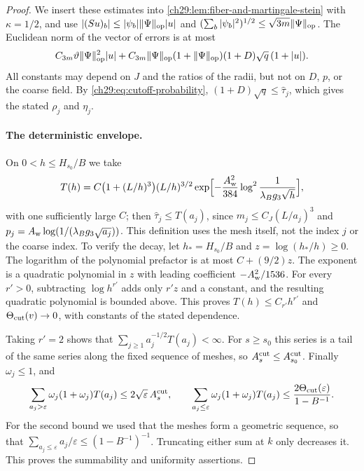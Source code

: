 \begin{proof}
We insert these estimates into \cref{ch29:lem:fiber-and-martingale-stein} with $\kappa=1/2$, and use $|(Su)_b|\le|\psi_b|\|\Psi\|_{\rm op}|u|$ and $(\sum_b|\psi_b|^2)^{1/2}\le\sqrt{3m}\|\Psi\|_{\rm op}$. The Euclidean norm of the vector of errors is at most
\[
 C_{3m}\vartheta\|\Psi\|_{\rm op}^2|u|+C_{3m}\|\Psi\|_{\rm op}(1+\|\Psi\|_{\rm op})(1+D)\sqrt q\,(1+|u|).
\]
All constants may depend on $J$ and the ratios of the radii, but not on $D$, $p$, or the coarse field. By \eqref{ch29:eq:cutoff-probability}, $(1+D)\sqrt q\le\widehat\tau_j$, which gives the stated $\rho_j$ and $\eta_j$.

\paragraph{The deterministic envelope.}
On $0<h\le H_{s_0}/B$ we take
\begin{equation}\label{ch29:eq:tail-envelope}
 T(h)=C\bigl(1+(L/h)^3\bigr)(L/h)^{3/2}\exp\Bigl[-\frac{A_{\rm w}^2}{384}\log^2\frac1{\lambda_Bg_3\sqrt h}\Bigr],
\end{equation}
with one sufficiently large $C$; then $\widehat\tau_j\le T(a_j)$, since $m_j\le C_J(L/a_j)^3$ and $p_j=A_{\rm w}\log(1/(\lambda_Bg_3\sqrt{a_j}))$. This definition uses the mesh itself, not the index $j$ or the coarse index. To verify the decay, let $h_*=H_{s_0}/B$ and $z=\log(h_*/h)\ge0$. The logarithm of the polynomial prefactor is at most $C+(9/2)z$. The exponent is a quadratic polynomial in $z$ with leading coefficient $-A_{\rm w}^2/1536$. For every $r'>0$, subtracting $\log h^{r'}$ adds only $r'z$ and a constant, and the resulting quadratic polynomial is bounded above. This proves $T(h)\le C_{r'}h^{r'}$ and $\Theta_{\rm cut}(v)\to0$, with constants of the stated dependence.

Taking $r'=2$ shows that $\sum_{j\ge1}a_j^{-1/2}T(a_j)<\infty$. For $s\ge s_0$ this series is a tail of the same series along the fixed sequence of meshes, so $A_s^{\rm cut}\le A_{s_0}^{\rm cut}$. Finally $\omega_j\le1$, and
\[
 \sum_{a_j>\varepsilon}\omega_j(1+\omega_j)T(a_j)\le2\sqrt\varepsilon\,A_s^{\rm cut},\qquad \sum_{a_j\le\varepsilon}\omega_j(1+\omega_j)T(a_j)\le\frac{2\Theta_{\rm cut}(\varepsilon)}{1-B^{-1}}.
\]
For the second bound we used that the meshes form a geometric sequence, so that $\sum_{a_j\le\varepsilon}a_j/\varepsilon\le(1-B^{-1})^{-1}$. Truncating either sum at $k$ only decreases it. This proves the summability and uniformity assertions.
\end{proof}

